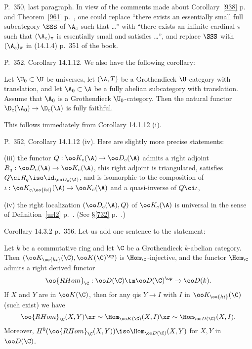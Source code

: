 \documentclass[12pt]{article}
\theoremstyle{remark}
\theoremstyle{definition}
\begin{document}


\begin{s} 
P.~350, last paragraph. In view of the comments made about Corollary~\ref{938} p.~ and Theorem~\ref{961} p.~, one could replace ``there exists an essentially small full subcategory $\SSS$ of $\A_c$ such that \dots'' with ``there exists an infinite cardinal $\pi$ such that $(\A_c)_\pi$ is essentially small and satisfies \dots'', and replace $\SSS$ with $(\A_c)_\pi$ in (14.1.4) p.~351 of the book.
\end{s}

%

\begin{s}
P.~352, Corollary 14.1.12. We also have the following corollary: 

Let $\U_0\subset\U$ be universes, let $(\A,T)$ be a Grothendieck $\U$-category with translation, and let $\A_0\subset\A$ be a fully abelian subcategory with translation. Assume that $\A_0$ is a Grothendieck $\U_0$-category. Then the natural functor $\D_c(\A_0)\to\D_c(\A)$ is fully faithful.

This follows immediately from Corollary 14.1.12 (i). 
\end{s}

%

\begin{s} 
P.~352, Corollary 14.1.12 (iv). Here are slightly more precise statements:

\nn(iii) the functor $Q:\oo K_c(\A)\to\oo D_c(\A)$ admits a right adjoint $R_q:\oo D_c(\A)\to\oo K_c(\A)$, this right adjoint is triangulated, satisfies $Q\ci R_q\iso\id_{\oo D_c(\A)}$, and is isomorphic to the composition of $\iota:\oo K_{c,\oo{hi}}(\A)\to\oo K_c(\A)$ and a quasi-inverse of $Q\ci\iota$,

\nn(iv) the right localization $(\oo D_c(\A),Q)$ of $\oo K_c(\A)$ is universal in the sense of Definition~\ref{url2} p.~. (See \S\ref{732} p.~.)
\end{s}

%

\begin{s}
Corollary 14.3.2 p.~356. Let us add one sentence to the statement:
%
\begin{cor}
Let $k$ be a commutative ring and let $\C$ be a Grothendieck $k$-abelian category. Then $(\oo K_{\oo{hi}}(\C),\oo K(\C)^{\op})$ is $\Hom_\C$-injective, and the functor $\Hom_\C$ admits a right derived functor 
$$
\oo{RHom}_\C:\oo D(\C)\tm\oo D(\C)^{\op}\to\oo D(k).
$$ 
If $X$ and $Y$ are in $\oo K(\C)$, then for any qis $Y\to I$ with $I$ in $\oo K_{\oo{hi}}(\C)$ (such exist) we have 
$$
\oo{RHom}_\C(X,Y)\xr\sim\Hom_{\oo K(\C)}(X,I)\xr\sim\Hom_{\oo D(\C)}(X,I).
$$ 
Moreover, $H^0(\oo{RHom}_\C(X,Y))\iso\Hom_{\oo D(\C)}(X,Y)$ for $X,Y$ in $\oo D(\C)$.
\end{cor}
\end{s}
\end{document}
